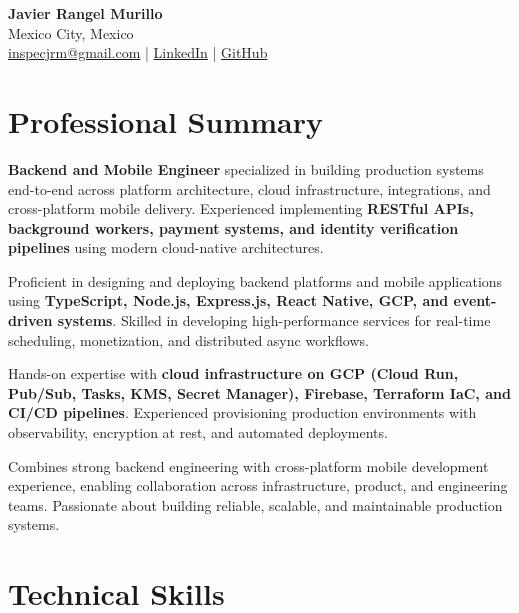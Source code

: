\documentclass[10pt, letterpaper]{article}
\begin{document}
\pagestyle{empty}

\begin{center}
  {\LARGE\bfseries Javier Rangel Murillo}\\[3pt]
  Mexico City, Mexico\\[1pt]
  \href{mailto:inspecjrm@gmail.com}{inspecjrm@gmail.com} \enspace|\enspace
  \href{https://linkedin.com/in/javierramu2004}{LinkedIn} \enspace|\enspace
  \href{https://github.com/JavierRangel2004}{GitHub}
\end{center}

\section{Professional Summary}

\textbf{Backend and Mobile Engineer} specialized in building production systems
end-to-end across platform architecture, cloud infrastructure, integrations,
and cross-platform mobile delivery. Experienced implementing \textbf{RESTful
APIs, background workers, payment systems, and identity verification pipelines}
using modern cloud-native architectures.

Proficient in designing and deploying backend platforms and mobile applications
using \textbf{TypeScript, Node.js, Express.js, React Native, GCP, and
event-driven systems}. Skilled in developing high-performance services for
real-time scheduling, monetization, and distributed async workflows.

Hands-on expertise with \textbf{cloud infrastructure on GCP (Cloud Run,
Pub/Sub, Tasks, KMS, Secret Manager), Firebase, Terraform IaC, and CI/CD
pipelines}. Experienced provisioning production environments with observability,
encryption at rest, and automated deployments.

Combines strong backend engineering with cross-platform mobile development
experience, enabling collaboration across infrastructure, product, and
engineering teams. Passionate about building reliable, scalable, and
maintainable production systems.

\section{Technical Skills}
\end{document}
